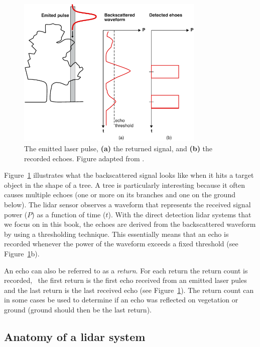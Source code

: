 \begin{figure}
	\centering
	\includegraphics[width=0.8\textwidth]{figs/lidar-multipulse.pdf}
	\caption{The emitted laser pulse, \textbf{(a)} the returned signal, and \textbf{(b)} the recorded echoes. Figure adapted from \citet{Bailly12}.}%
\label{fig:lidar-multipulse}
\end{figure}
Figure~\ref{fig:lidar-multipulse} illustrates what the backscattered signal looks like when it hits a target object in the shape of a tree. 
A tree is particularly interesting because it often causes multiple echoes (one or more on its branches and one on the ground below).  The lidar sensor observes a waveform that represents the received signal power ($P$) as a function of time ($t$). 
With the direct detection lidar systems that we focus on in this book, the echoes are derived from the backscattered waveform by using a thresholding technique. This essentially means that an echo is recorded whenever the power of the waveform exceeds a fixed threshold (see Figure~\ref{fig:lidar-multipulse}b). 

An echo can  also  be referred to as a \emph{return}. 
For each return the return count is recorded, 
\eg\ the first return is the first echo received from an emitted laser pules and the last return is the last received echo (see Figure~\ref{fig:lidar-multipulse}). The return count can in some cases be used to determine if an echo was reflected on vegetation or ground (ground should then be the last return).


\subsection{Anatomy of a lidar system}%
\label{lidar:anatomy}


